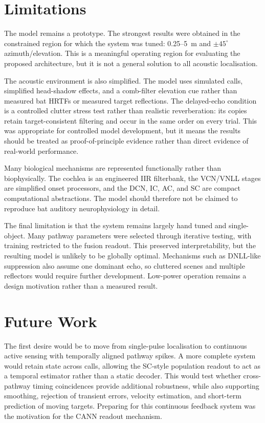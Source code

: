 \section{Limitations}

The model remains a prototype. The strongest results were obtained in the constrained region for which the system was tuned: 0.25--5~m and $\pm45^\circ$ azimuth/elevation. This is a meaningful operating region for evaluating the proposed architecture, but it is not a general solution to all acoustic localisation.

The acoustic environment is also simplified. The model uses simulated calls, simplified head-shadow effects, and a comb-filter elevation cue rather than measured bat HRTFs or measured target reflections. The delayed-echo condition is a controlled clutter stress test rather than realistic reverberation: its copies retain target-consistent filtering and occur in the same order on every trial. This was appropriate for controlled model development, but it means the results should be treated as proof-of-principle evidence rather than direct evidence of real-world performance.

Many biological mechanisms are represented functionally rather than biophysically. The cochlea is an engineered IIR filterbank, the VCN/VNLL stages are simplified onset processors, and the DCN, IC, AC, and SC are compact computational abstractions. The model should therefore not be claimed to reproduce bat auditory neurophysiology in detail.

The final limitation is that the system remains largely hand tuned and single-object. Many pathway parameters were selected through iterative testing, with training restricted to the fusion readout. This preserved interpretability, but the resulting model is unlikely to be globally optimal. Mechanisms such as DNLL-like suppression also assume one dominant echo, so cluttered scenes and multiple reflectors would require further development. Low-power operation remains a design motivation rather than a measured result.

\section{Future Work}

The first desire would be to move from single-pulse localisation to continuous active sensing with temporally aligned pathway spikes. A more complete system would retain state across calls, allowing the SC-style population readout to act as a temporal estimator rather than a static decoder. This would test whether cross-pathway timing coincidences provide additional robustness, while also supporting smoothing, rejection of transient errors, velocity estimation, and short-term prediction of moving targets. Preparing for this continuous feedback system was the motivation for the CANN readout mechanism.

